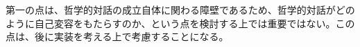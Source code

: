\documentclass[b5j,twoside,twocolumn]{utarticle}
\begin{document}
第一の点は、哲学的対話の成立自体に関わる障壁であるため、哲学的対話がどのように自己変容をもたらすのか、という点を検討する上では重要ではない。この点は、後に実装を考える上で考慮することになる。











\end{document}
